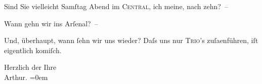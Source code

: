 \pstart
           Sind Sie vielleicht Samſtag{ }Abend im {\pb}\textsc{Central}, ich meine, nach zehn? –\pend
           
\pstart
           Wann gehn wir ins Arſenal? –\pend
           
\pstart
           Und, überhaupt, wann{ }ſehn wir uns wieder? Daſs uns nur \textsc{Trio}’s zuſa{\geminationm}enführen, iſt eigentlich komiſch.\pend
           
\pstart
           Herzlich der Ihre{\\[\baselineskip]}\spacefill\mbox{Arthur.}\pend
           \leftskip=0em{}\endnumbering{}  \newcommand{\dateiname}{L00305}\newcommand{\titel}{Arthur Schnitzler an Hugo von Hofmannsthal, [9. 3. 1894]}\newcommand{\editorInnen}{Martin Anton Müller und Gerd-Hermann Susen}
